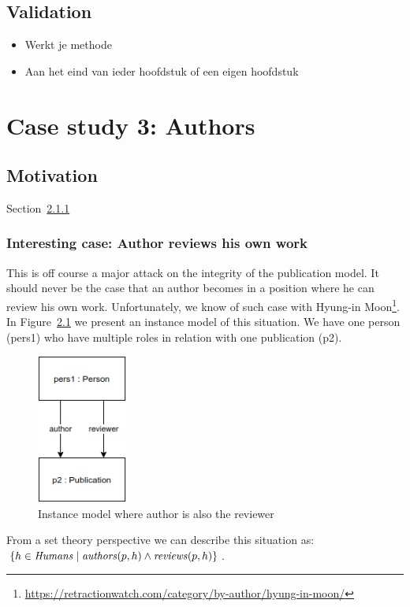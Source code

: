 \documentclass{ou-report}
\newcommand{\outline}[1]{{\color{blue} #1}}
\begin{document}
\section{Validation}
\outline{
\begin{itemize}
    \item Werkt je methode
    \item Aan het eind van ieder hoofdstuk of een eigen hoofdstuk
\end{itemize}
}
\chapter{Case study 3: Authors}
\label{chp:case3}
\section{Motivation}
Section~\ref{interesting_case:author_reviews_own_work}

\subsection{Interesting case: Author reviews his own work}
\label{interesting_case:author_reviews_own_work}
This is off course a major attack on the integrity of the publication model. It 
should never be the case that an author becomes in a position where he can 
review his own work. Unfortunately, we know of such case with Hyung-in
Moon\footnote{\url{https://retractionwatch.com/category/by-author/hyung-in-moon/}}. 
In 
Figure~\ref{fig:air} we present an instance model of this situation. We have 
one person (pers1) who have multiple roles in relation with one publication (p2).

\begin{figure}[H]
\centering
\includegraphics[width=3cm]{images/author_is_reviewer.drawio.png}
\caption{Instance model where author is also the reviewer}
\label{fig:air}
\end{figure}
From a set theory perspective we can describe this situation as: 
$\{h \in \mathit{Humans} \mid \mathit{authors}(p, h) \land \mathit{reviews}(p, h)\}$.
\end{document}
